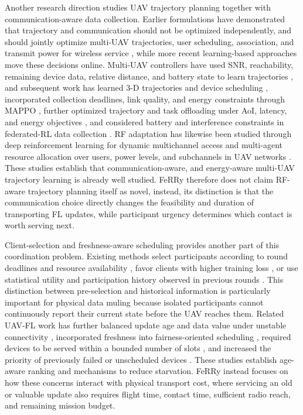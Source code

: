 \documentclass[conference]{IEEEtran}
\begin{document}
Another research direction studies UAV trajectory planning together with communication-aware data collection. Earlier formulations have demonstrated that trajectory and communication should not be optimized independently, and should jointly optimize multi-UAV trajectories, user scheduling, association, and transmit power for wireless service \cite{wu2018joint}, while more recent learning-based approaches move these decisions online. Multi-UAV controllers have used SNR, reachability, remaining device data, relative distance, and battery state to learn trajectories \cite{chen2023model}, and subsequent work has learned 3-D trajectories and device scheduling \cite{gao2024federated}, incorporated collection deadlines, link quality, and energy constraints through MAPPO \cite{mondal2025deep}, further optimized trajectory and task offloading under AoI, latency, and energy objectives \cite{wang2025joint}, and considered battery and interference constraints in federated-RL data collection \cite{kumar2026battery}. RF adaptation has likewise been studied through deep reinforcement learning for dynamic multichannel access \cite{wang2018deep} and multi-agent resource allocation over users, power levels, and subchannels in UAV networks \cite{cui2019multi}. These studies establish that communication-aware, and energy-aware multi-UAV trajectory learning is already well studied. FeRRy therefore does not claim RF-aware trajectory planning itself as novel, instead, its distinction is that the communication choice directly changes the feasibility and duration of transporting FL updates, while participant urgency determines which contact is worth serving next.

Client-selection and freshness-aware scheduling provides another part of this coordination problem. Existing methods select participants according to round deadlines and resource availability \cite{nishio2019client}, favor clients with higher training loss \cite{cho2022towards}, or use statistical utility and participation history observed in previous rounds \cite{lai2021oort}. This distinction between pre-selection and historical information is particularly important for physical data muling because isolated participants cannot continuously report their current state before the UAV reaches them. Related UAV-FL work has further balanced update age and data value under unstable connectivity \cite{cui2023data}, incorporated freshness into fairness-oriented scheduling \cite{zhu2024fairness}, required devices to be served within a bounded number of slots \cite{zhai2024uav}, and increased the priority of previously failed or unscheduled devices \cite{mestoukirdi2022uav}. These studies establish age-aware ranking and mechanisms to reduce starvation. FeRRy instead focuses on how these concerns interact with physical transport cost, where servicing an old or valuable update also requires flight time, contact time, sufficient radio reach, and remaining mission budget. 
\end{document}
